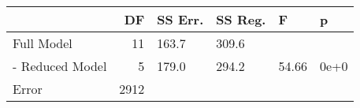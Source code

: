 \begin{tabular}{lrllll}
\toprule
{} &    DF & SS Err. & SS Reg. &     F &    p \\
\midrule
Full Model      &    11 &   163.7 &   309.6 &       &      \\
- Reduced Model &     5 &   179.0 &   294.2 & 54.66 & 0e+0 \\
Error           &  2912 &         &         &       &      \\
\bottomrule
\end{tabular}
